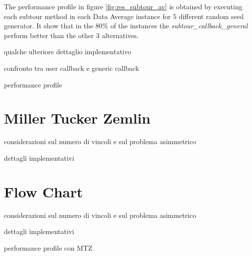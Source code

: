 The performance profile in figure \ref{fig:res_subtour_av} is obtained by executing each subtour method in each Data Average instance for 5 different random seed generator. It show that in the $ 80\%  $  of the instances the \textit{subtour\_callback\_general} perform better than the other 3 alternatives.

qualche ulteriore dettaglio implementativo

confronto tra user callback e generic callback 

performance profile


\section{Miller Tucker Zemlin}

considerazioni sul numero di vincoli e sul problema asimmetrico

dettagli implementativi


\section{Flow Chart}

considerazioni sul numero di vincoli e sul problema asimmetrico

dettagli implementativi

performance profile con MTZ
